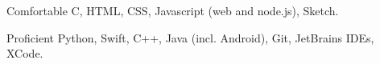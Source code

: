
\begin{cvskills}

	\cvskill
	{Comfortable} %
	{C, HTML, CSS, Javascript (web and node.js), Sketch.} %

	\cvskill
    {Proficient} %
    {Python, Swift, C++, Java (incl. Android), Git, JetBrains IDEs, XCode.} %
    

\end{cvskills}
